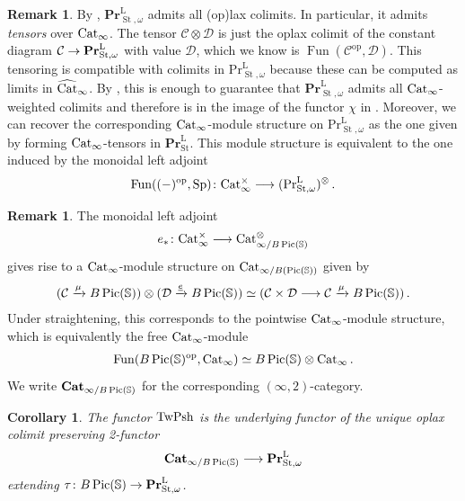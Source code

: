\documentclass[10pt]{amsart}
\numberwithin{equation}{section}
\newtheorem{cor}[prop]{Corollary}
\theoremstyle{definition}
\newtheorem{rem}[prop]{Remark}
\DeclareMathOperator{\Fun}{Fun}
\DeclareMathOperator{\Pic}{Pic}
\DeclareMathOperator{\op}{op}
\DeclareMathOperator{\St}{St}
\renewcommand{\Pr}{\mathrm{Pr}}
\newcommand{\bfPr}{\mathbf{Pr}}
\newcommand{\rL}{\mathrm{L}}
\newcommand{\TwShv}{\mathrm{TwPsh}\vphantom{h}}
\newcommand{\Cat}{\mathrm{Cat}\vphantom{t}}
\newcommand{\bfCat}{\mathbf{Cat}\vphantom{t}}
\newcommand{\bS}{\mathbb{S}}
\newcommand{\cC}{\mathcal{C}}
\newcommand{\calD}{\mathcal{D}}
\newcommand{\Sp}{\mathrm{Sp}\vphantom{p}}
\renewcommand{\to}{\mathchoice{\longrightarrow}{\rightarrow}{}{}}
\begin{document}
\begin{rem}\label{rem:PrLSt_omega_from_module}
	By , $\bfPr^{\rL}_{\St,\omega}$ admits all (op)lax colimits.
  In particular, it admits \emph{tensors} over $\Cat_{\infty}$.
  The tensor $\cC\otimes \calD$ is just the oplax colimit of the constant diagram $\cC \to \bfPr^{\rL}_{\St,\omega}$ with value $\calD$, which we know is $\Fun(\cC^{\op},\calD)$.
  This tensoring is compatible with colimits in $\Pr^{\rL}_{\St,\omega}$ because these can be computed as limits in $\widehat{\Cat}_{\infty}$.
  By \cite[Proposition 3.64]{heine2024higher}, this is enough to guarantee that $\bfPr^{\rL}_{\St,\omega}$ admits all $\Cat_{\infty}$-weighted colimits and therefore is in the image of the functor $\chi$ in .
  Moreover, we can recover the corresponding $\Cat_{\infty}$-module structure on $\Pr^{\rL}_{\St,\omega}$ as the one given by forming $\Cat_{\infty}$-tensors in $\bfPr^{\rL}_{\St}$.
  This module structure is equivalent to the one induced by the monoidal left adjoint
	\begin{align}\label{eq:Pr^L_omega_tensoring}
		\Fun( (-)^{\op},\Sp ) \colon \Cat_{\infty}^{\times} \to (\Pr^{\rL}_{\St,\omega})^{\otimes} \,.
	\end{align}
\end{rem}
\begin{rem}\label{rem:cat_/BPic-2-category}
	The monoidal left adjoint
	\begin{align*}
		e_{*}\colon \Cat_{\infty}^{\times} \to \Cat_{\infty/B\Pic(\bS)}^{\otimes}
	\end{align*}
	gives rise to a $\Cat_{\infty}$-module structure on $\Cat_{\infty /B(\Pic(\bS))}$ given by
	\begin{align*}
	(\cC \xrightarrow{\mu} B\Pic(\bS) ) \otimes (\calD \xrightarrow{\underline{e}} B\Pic(\bS) ) \simeq (\cC \times \calD  \to \cC \xrightarrow{\mu} B\Pic(\bS)  ) \,.
	\end{align*}
	Under straightening, this corresponds to the pointwise $\Cat_{\infty}$-module structure, which is equivalently the free $\Cat_{\infty}$-module
	\begin{align*}
		\Fun(B\Pic(\bS)^{\op}, \Cat_{\infty} ) \simeq B\Pic(\bS)\otimes \Cat_{\infty} \,.
	\end{align*}
	We write $\bfCat_{\infty/B\Pic(\bS)}$ for the corresponding $(\infty,2)$-category.
\end{rem}
\begin{cor}\label{cor:TwShv_as_kan_ext}
	The functor $\TwShv$ is the underlying functor of the unique oplax colimit preserving 2-functor
	\begin{align*}
		\bfCat_{\infty/B\Pic(\bS)} \to \bfPr^{\rL}_{\St,\omega}
	\end{align*}
	extending $\tau \colon B\Pic(\bS) \to \bfPr^{\rL}_{\St,\omega}$.
\end{cor}
\end{document}
